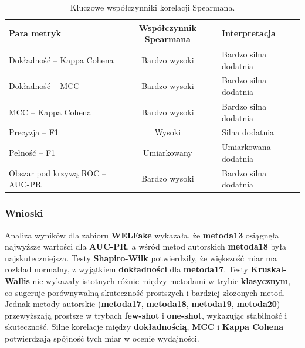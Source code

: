 \begin{table}[H]
	\centering
	\caption{Kluczowe współczynniki korelacji Spearmana.}
	\label{tab:welfake_spearman_correlations}
	\begin{tabular}{l c l}
		\toprule
		\textbf{Para metryk}            & \textbf{Współczynnik Spearmana} & \textbf{Interpretacja} \\
		\midrule
		Dokładność -- Kappa Cohena      & Bardzo wysoki                   & Bardzo silna dodatnia  \\
		Dokładność -- MCC               & Bardzo wysoki                   & Bardzo silna dodatnia  \\
		MCC -- Kappa Cohena             & Bardzo wysoki                   & Bardzo silna dodatnia  \\
		Precyzja -- F1                  & Wysoki                          & Silna dodatnia         \\
		Pełność -- F1                   & Umiarkowany                     & Umiarkowana dodatnia   \\
		Obszar pod krzywą ROC -- AUC-PR & Bardzo wysoki                   & Bardzo silna dodatnia  \\
		\bottomrule
	\end{tabular}
\end{table}

\subsubsection{Wnioski}

Analiza wyników dla zabioru \textbf{WELFake} wykazała, że \textbf{metoda13} osiągnęła najwyższe wartości dla \textbf{AUC-PR}, a wśród metod autorskich \textbf{metoda18} była najskuteczniejsza. Testy \textbf{Shapiro-Wilk} potwierdziły, że większość miar ma rozkład normalny, z wyjątkiem \textbf{dokładności} dla \textbf{metoda17}. Testy \textbf{Kruskal-Wallis} nie wykazały istotnych różnic między metodami w trybie \textbf{klasycznym}, co sugeruje porównywalną skuteczność prostszych i bardziej złożonych metod. Jednak metody autorskie (\textbf{metoda17}, \textbf{metoda18}, \textbf{metoda19}, \textbf{metoda20}) przewyższają prostsze w trybach \textbf{few-shot} i \textbf{one-shot}, wykazując stabilność i skuteczność. Silne korelacje między \textbf{dokładnością}, \textbf{MCC} i \textbf{Kappa Cohena} potwierdzają spójność tych miar w ocenie wydajności.